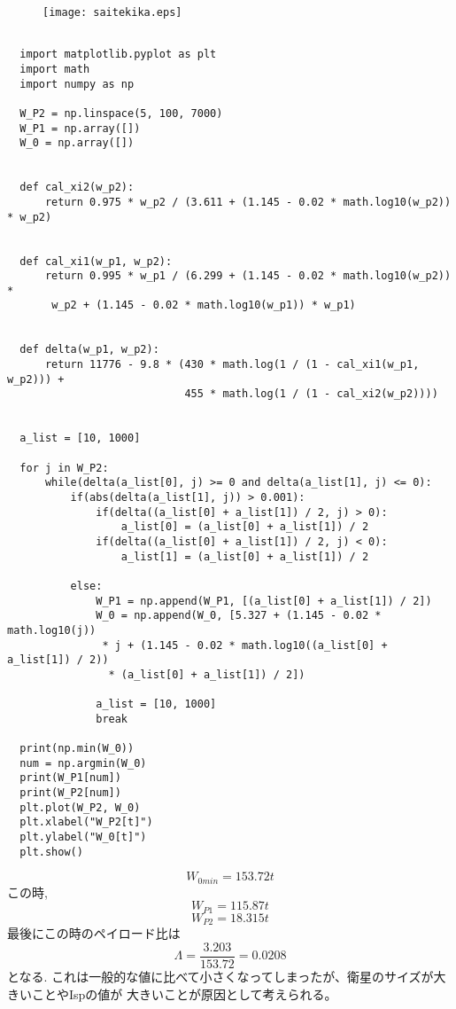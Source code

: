 \documentclass[15pt,uplatex,dvipdfmx]{jsarticle}
\begin{document}
\begin{figure}[H]
\begin{center}
  \texttt{[image: saitekika.eps]}
\end{center}
\end{figure} \newpage

\begin{lstlisting}[basicstyle=\ttfamily\footnotesize, frame=single]

  import matplotlib.pyplot as plt
  import math
  import numpy as np

  W_P2 = np.linspace(5, 100, 7000)
  W_P1 = np.array([])
  W_0 = np.array([])


  def cal_xi2(w_p2):
      return 0.975 * w_p2 / (3.611 + (1.145 - 0.02 * math.log10(w_p2)) * w_p2)


  def cal_xi1(w_p1, w_p2):
      return 0.995 * w_p1 / (6.299 + (1.145 - 0.02 * math.log10(w_p2)) *
       w_p2 + (1.145 - 0.02 * math.log10(w_p1)) * w_p1)


  def delta(w_p1, w_p2):
      return 11776 - 9.8 * (430 * math.log(1 / (1 - cal_xi1(w_p1, w_p2))) +
                            455 * math.log(1 / (1 - cal_xi2(w_p2))))


  a_list = [10, 1000]

  for j in W_P2:
      while(delta(a_list[0], j) >= 0 and delta(a_list[1], j) <= 0):
          if(abs(delta(a_list[1], j)) > 0.001):
              if(delta((a_list[0] + a_list[1]) / 2, j) > 0):
                  a_list[0] = (a_list[0] + a_list[1]) / 2
              if(delta((a_list[0] + a_list[1]) / 2, j) < 0):
                  a_list[1] = (a_list[0] + a_list[1]) / 2

          else:
              W_P1 = np.append(W_P1, [(a_list[0] + a_list[1]) / 2])
              W_0 = np.append(W_0, [5.327 + (1.145 - 0.02 * math.log10(j))
               * j + (1.145 - 0.02 * math.log10((a_list[0] + a_list[1]) / 2))
                * (a_list[0] + a_list[1]) / 2])

              a_list = [10, 1000]
              break

  print(np.min(W_0))
  num = np.argmin(W_0)
  print(W_P1[num])
  print(W_P2[num])
  plt.plot(W_P2, W_0)
  plt.xlabel("W_P2[t]")
  plt.ylabel("W_0[t]")
  plt.show()
\end{lstlisting}

\begin{equation}
  W_{0min} = 153.72t
\end{equation}
この時,
\begin{equation}
  W_{P1} = 115.87t
\end{equation}
\begin{equation}
  W_{P2} = 18.315t
\end{equation}
最後にこの時のペイロード比は
\begin{equation}
  \Lambda =\frac{3.203}{153.72} = 0.0208
\end{equation}
となる.
これは一般的な値に比べて小さくなってしまったが、衛星のサイズが大きいことやIspの値が
大きいことが原因として考えられる。
\end{document}
